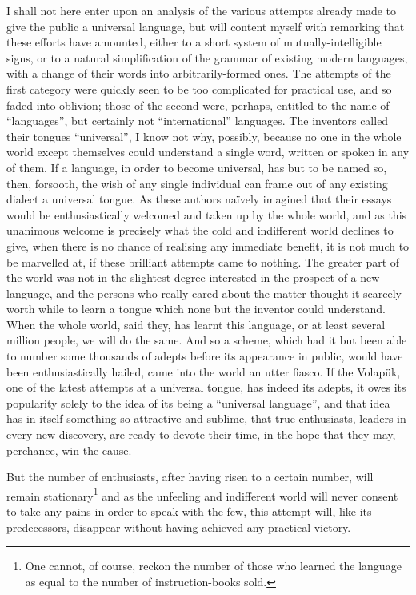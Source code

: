 I shall not here enter upon an analysis of the various attempts already made to give the public a universal language, but will content myself with remarking that these efforts have amounted, either to a short system of mutually-intelligible signs, or to a natural simplification of the grammar of existing modern languages, with a change of their words into arbitrarily-formed ones. The attempts of the first category were quickly seen to be too complicated for practical use, and so faded into oblivion; those of the second were, perhaps, entitled to the name of “languages”, but certainly not “international” languages. The inventors called their tongues “universal”, I know not why, possibly, because no one in the whole world except themselves could understand a single word, written or spoken in any of them. If a language, in order to become universal, has but to be named so, then, forsooth, the wish of any single individual can frame out of any existing dialect a universal tongue. As these authors na\"{i}vely imagined that their essays would be enthusiastically welcomed and taken up by the whole world, and as this unanimous welcome is precisely what the cold and indifferent world declines to give, when there is no chance of realising any immediate benefit, it is not much to be marvelled at, if these brilliant attempts came to nothing. The greater part of the world was not in the slightest degree interested in the prospect of a new language, and the persons who really cared about the matter thought it scarcely worth while to learn a tongue which none but the inventor could understand. When the whole world, said they, has learnt this language, or at least several million people, we will do the same. And so a scheme, which had it but been able to number some thousands of adepts before its appearance in public, would have been enthusiastically hailed, came into the world an utter fiasco. If the \glqq{}Volapük\grqq{}, one of the latest attempts at a universal tongue, has indeed its adepts, it owes its popularity solely to the idea of its being a “universal language”, and that idea has in itself something so attractive and sublime, that true enthusiasts, leaders in every new discovery, are ready to devote their time, in the hope that they may, perchance, win the cause.

But the number of enthusiasts, after having risen to a certain number, will remain stationary\footnote{One cannot, of course, reckon the number of those who learned the language as equal to the number of instruction-books sold.} and as the unfeeling and indifferent world will never consent to take any pains in order to speak with the few, this attempt will, like its predecessors, disappear without having achieved any practical victory.

